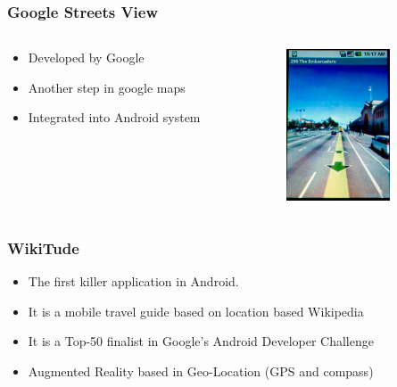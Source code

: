\documentclass{beamer}
\begin{document}
\begin{frame}
\frametitle{Google Streets View}

\begin{columns}

\begin{column}{0.6\textwidth}
\begin{itemize}
\item Developed by Google
\item Another step in google maps
\item Integrated into Android system
\end{itemize}

\begin{center}
\end{center}
\end{column}

\begin{column}{0.4\textwidth}
\begin{center}
  \includegraphics[height=4.5cm]{figs/googleStreetsView.jpg}
\end{center}

\end{column}
\end{columns}

\end{frame}

\begin{frame}
\frametitle{WikiTude}

\begin{itemize} 
\item The first killer application in Android.
\item It is a mobile travel guide based on location based Wikipedia
\item It is a Top-50 finalist in Google's Android Developer Challenge
\item Augmented Reality based in Geo-Location (GPS and compass)
\end{itemize}

\begin{center}
\end{center}

\end{frame}
\end{document}

